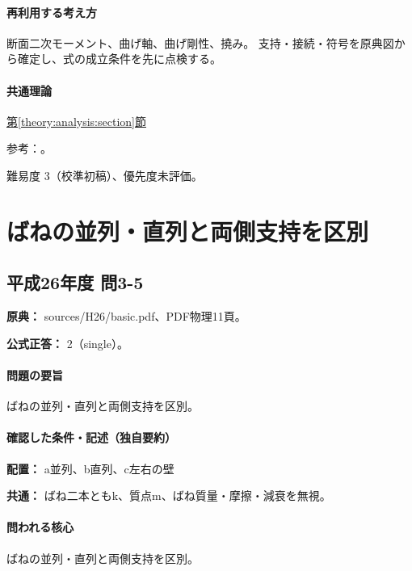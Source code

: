 \paragraph{再利用する考え方} 断面二次モーメント、曲げ軸、曲げ剛性、撓み。 支持・接続・符号を原典図から確定し、式の成立条件を先に点検する。

\paragraph{共通理論} \hyperref[theory:analysis:section]{第\ref*{theory:analysis:section}節}

\par 参考：\cite{struct_mit_beam}。

\par 難易度 3（校準初稿）、優先度未評価。

\section{ばねの並列・直列と両側支持を区別}

\subsection{平成26年度 問3-5}
\label{q:h26-reg-basic-3-5}

\noindent\textbf{原典：} sources/H26/basic.pdf、PDF物理11頁。

\textbf{公式正答：} 2（single）。

\paragraph{問題の要旨} ばねの並列・直列と両側支持を区別。

\paragraph{確認した条件・記述（独自要約）}\mbox{}\par

\noindent\textbf{配置：} a並列、b直列、c左右の壁\par

\noindent\textbf{共通：} ばね二本ともk、質点m、ばね質量・摩擦・減衰を無視。\par

\paragraph{問われる核心} ばねの並列・直列と両側支持を区別。

